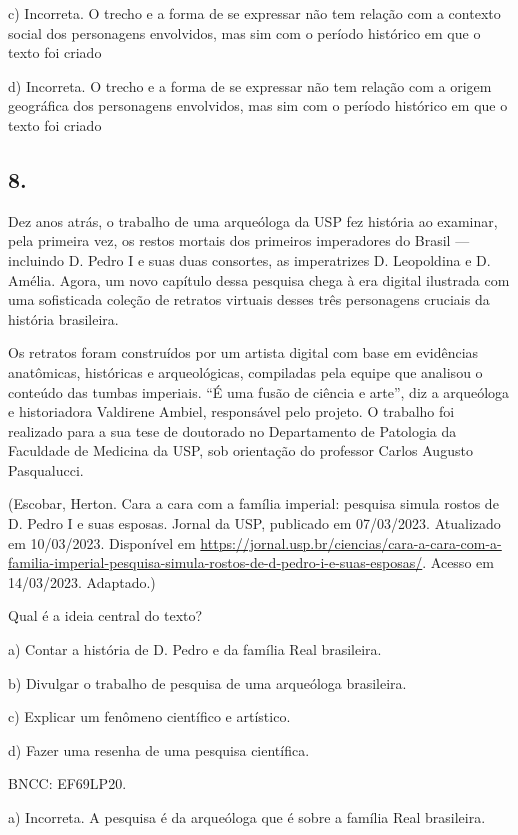 {c) Incorreta. O trecho e a forma de se expressar não tem relação com a
contexto social dos personagens envolvidos, mas sim com o período
histórico em que o texto foi criado

d) Incorreta. O trecho e a forma de se expressar não tem relação com a
origem geográfica dos personagens envolvidos, mas sim com o período
histórico em que o texto foi criado

\subsection{8.}

Dez anos atrás, o trabalho de uma arqueóloga da USP fez história ao
examinar, pela primeira vez, os restos mortais dos primeiros imperadores
do Brasil --- incluindo D. Pedro I e suas duas consortes, as
imperatrizes D. Leopoldina e D. Amélia. Agora, um novo capítulo dessa
pesquisa chega à era digital ilustrada com uma sofisticada coleção de
retratos virtuais desses três personagens cruciais da história
brasileira.

Os retratos foram construídos por um artista digital com base em
evidências anatômicas, históricas e arqueológicas, compiladas pela
equipe que analisou o conteúdo das tumbas imperiais. ``É uma fusão de
ciência e arte'', diz a arqueóloga e historiadora Valdirene Ambiel,
responsável pelo projeto. O trabalho foi realizado para a sua tese de
doutorado no Departamento de Patologia da Faculdade de Medicina da USP,
sob orientação do professor Carlos Augusto Pasqualucci.

(Escobar, Herton. Cara a cara com a família imperial: pesquisa simula
rostos de D. Pedro I e suas esposas. Jornal da USP, publicado em
07/03/2023. Atualizado em 10/03/2023. Disponível em
\url{https://jornal.usp.br/ciencias/cara-a-cara-com-a-familia-imperial-pesquisa-simula-rostos-de-d-pedro-i-e-suas-esposas/}.
Acesso em 14/03/2023. Adaptado.)

Qual é a ideia central do texto?

a) Contar a história de D. Pedro e da família Real brasileira.

b) Divulgar o trabalho de pesquisa de uma arqueóloga brasileira.

c) Explicar um fenômeno científico e artístico.

d) Fazer uma resenha de uma pesquisa científica.

BNCC: EF69LP20.

a) Incorreta. A pesquisa é da arqueóloga que é sobre a família Real
brasileira.

}
